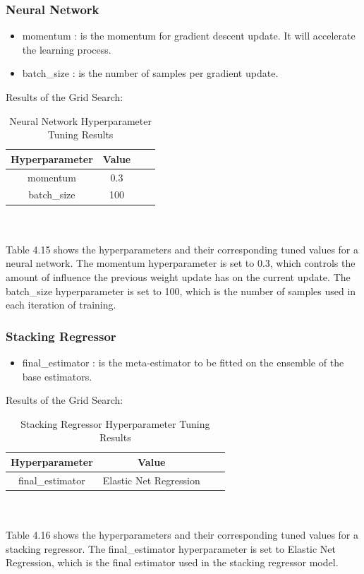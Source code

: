 \documentclass{report}
\begin{document}
\subsubsection{Neural Network}
\begin{itemize}
    \item momentum : is the momentum for gradient descent update. It will accelerate the learning process\cite{scikit-learn}. 
    \item batch\_size : is the number of samples per gradient update\cite{scikit-learn}. 
\end{itemize}
\break
Results of the Grid Search:
\begin{table}[h]
\centering
\begin{tabular}{|c|c|c|c|}
\hline
\textbf{Hyperparameter} & \textbf{Value} \\ \hline
momentum & 0.3 \\ \hline
batch\_size & 100 \\ \hline
\end{tabular}
\caption{Neural Network Hyperparameter Tuning Results}
\end{table}\\
\\
Table 4.15 shows the hyperparameters and their corresponding tuned values for a neural network. The momentum hyperparameter is set to 0.3, which controls the amount of influence the previous weight update has on the current update. The batch\_size hyperparameter is set to 100, which is the number of samples used in each iteration of training. 
\subsubsection{Stacking Regressor}
\begin{itemize}
    \item final\_estimator : is the meta-estimator to be fitted on the ensemble of the base estimators\cite{scikit-learn}. 
\end{itemize}
Results of the Grid Search:
\begin{table}[h]
\centering
\begin{tabular}{|c|c|c|c|}
\hline
\textbf{Hyperparameter} & \textbf{Value} \\ \hline
final\_estimator & Elastic Net Regression \\ \hline
\end{tabular}
\caption{Stacking Regressor Hyperparameter Tuning Results}
\end{table}\\
\\
Table 4.16 shows the hyperparameters and their corresponding tuned values for a stacking regressor. The final\_estimator hyperparameter is set to Elastic Net Regression, which is the final estimator used in the stacking regressor model. 
\newpage
\end{document}
